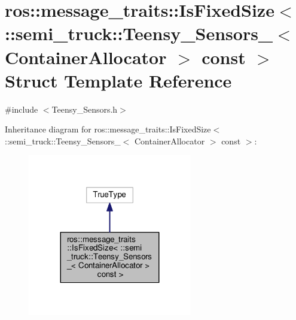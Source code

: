 \hypertarget{structros_1_1message__traits_1_1_is_fixed_size_3_01_1_1semi__truck_1_1_teensy___sensors___3_01_cb53d5848a141775744a1974dc7127755}{}\section{ros\+:\+:message\+\_\+traits\+:\+:Is\+Fixed\+Size$<$ \+:\+:semi\+\_\+truck\+:\+:Teensy\+\_\+\+Sensors\+\_\+$<$ Container\+Allocator $>$ const $>$ Struct Template Reference}
\label{structros_1_1message__traits_1_1_is_fixed_size_3_01_1_1semi__truck_1_1_teensy___sensors___3_01_cb53d5848a141775744a1974dc7127755}


{\ttfamily \#include $<$Teensy\+\_\+\+Sensors.\+h$>$}



Inheritance diagram for ros\+:\+:message\+\_\+traits\+:\+:Is\+Fixed\+Size$<$ \+:\+:semi\+\_\+truck\+:\+:Teensy\+\_\+\+Sensors\+\_\+$<$ Container\+Allocator $>$ const $>$\+:\nopagebreak
\begin{figure}[H]
\begin{center}
\leavevmode
\includegraphics[width=203pt]{structros_1_1message__traits_1_1_is_fixed_size_3_01_1_1semi__truck_1_1_teensy___sensors___3_01_cbfa71abce16c9c1adb8a197a0358ffd5}
\end{center}
\end{figure}


